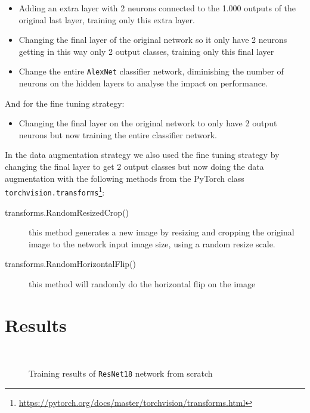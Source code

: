 \documentclass[twocolumn]{article}
\newcommand{\tamfig}{0.9}
\begin{document}
\begin{itemize}[noitemsep]
\item Adding an extra layer with 2 neurons connected to the 1.000 outputs of the original last layer, training only this extra layer.

\item Changing the final layer of the original network so it only have 2 neurons getting in this way only 2 output classes, training only this final layer

\item Change the entire \texttt{AlexNet} classifier network, diminishing the number of neurons on the hidden layers to analyse the impact on performance.
\end{itemize}
And for the fine tuning strategy:
\begin{itemize}[noitemsep]
\item Changing the final layer on the original network to only have 2 output neurons but now training the entire classifier network.
\end{itemize}

In the data augmentation strategy we also used the fine tuning strategy by changing the final layer to get 2 output classes but now doing the data augmentation with the following methods from the PyTorch class \texttt{torchvision.transforms}\footnote{\url{https://pytorch.org/docs/master/torchvision/transforms.html}}:
\begin{description}
\item[transforms.RandomResizedCrop()] this method generates a new image by resizing and cropping the original image to the network input image size, using a random resize scale.
\item[transforms.RandomHorizontalFlip()] this method will randomly do the horizontal flip on the image
\end{description}

\section{Results}
\begin{figure}[h]
\\
\caption{Training results of \texttt{ResNet18} network from scratch}
\label{grafico_zero}
\end{figure}
\end{document}
